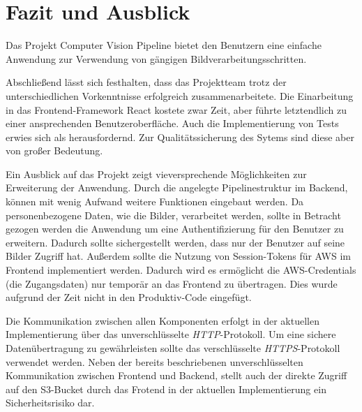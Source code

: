 \section{Fazit und Ausblick}
Das Projekt Computer Vision Pipeline bietet den Benutzern eine einfache Anwendung zur Verwendung von gängigen Bildverarbeitungsschritten.

Abschließend lässt sich festhalten, dass das Projektteam trotz der unterschiedlichen Vorkenntnisse erfolgreich zusammenarbeitete. Die Einarbeitung in das Frontend-Framework React kostete zwar Zeit, aber führte letztendlich zu einer ansprechenden Benutzeroberfläche. Auch die Implementierung von Tests erwies sich als herausfordernd. Zur Qualitätssicherung des Sytems sind diese aber von großer Bedeutung.

Ein Ausblick auf das Projekt zeigt vieversprechende Möglichkeiten zur Erweiterung der Anwendung. Durch die angelegte Pipelinestruktur im Backend, können mit wenig Aufwand weitere Funktionen eingebaut werden. Da personenbezogene Daten, wie die Bilder, verarbeitet werden, sollte in Betracht gezogen werden die Anwendung um eine Authentifizierung für den Benutzer zu erweitern. Dadurch sollte sichergestellt werden, dass nur der Benutzer auf seine Bilder Zugriff hat. Außerdem sollte die Nutzung von Session-Tokens für AWS im Frontend implementiert werden. Dadurch wird es ermöglicht die AWS-Credentials (die Zugangsdaten) nur temporär an das Frontend zu übertragen. Dies wurde aufgrund der Zeit nicht in den Produktiv-Code eingefügt. 

Die Kommunikation zwischen allen Komponenten erfolgt in der aktuellen Implementierung über das unverschlüsselte \textit{HTTP}-Protokoll. Um eine sichere Datenübertragung zu gewährleisten sollte das verschlüsselte \textit{HTTPS}-Protokoll verwendet werden. Neben der bereits beschriebenen unverschlüsselten Kommunikation zwischen Frontend und Backend, stellt auch der direkte Zugriff auf den S3-Bucket durch das Frotend in der aktuellen Implementierung ein Sicherheitsrisiko dar.